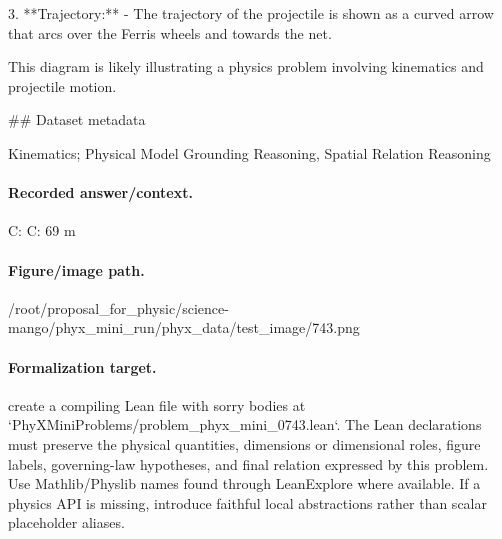 3. **Trajectory:**
   - The trajectory of the projectile is shown as a curved arrow that arcs over the Ferris wheels and towards the net.

This diagram is likely illustrating a physics problem involving kinematics and projectile motion.

\#\# Dataset metadata

Kinematics; Physical Model Grounding Reasoning, Spatial Relation Reasoning

\paragraph{Recorded answer/context.}
C: C: 69 m

\paragraph{Figure/image path.}
/root/proposal\_for\_physic/science-mango/phyx\_mini\_run/phyx\_data/test\_image/743.png

\paragraph{Formalization target.}
create a compiling Lean file with sorry bodies at `PhyXMiniProblems/problem\_phyx\_mini\_0743.lean`. The Lean declarations must preserve the physical quantities, dimensions or dimensional roles, figure labels, governing-law hypotheses, and final relation expressed by this problem.
Use Mathlib/Physlib names found through LeanExplore where available. If a physics API is missing, introduce faithful local abstractions rather than scalar placeholder aliases.

